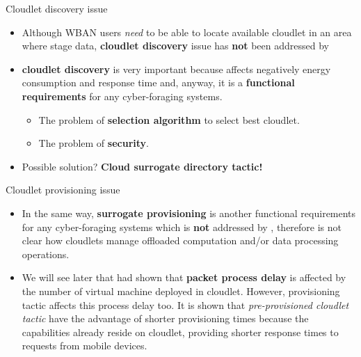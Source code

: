 \documentclass[10pt]{beamer}
\begin{document}
\begin{frame}{Cloudlet discovery issue} 

\begin{itemize}

\item Although WBAN users \textit{need} to be able to locate available cloudlet in an area where stage data, \textbf{cloudlet discovery} issue has \textbf{not} been addressed by \citet{MSAReport}

\item \textbf{cloudlet discovery} is very important because affects negatively energy consumption and response time and, anyway, it is a \textbf{functional requirements} for any cyber-foraging systems. 

\begin{itemize}
\item The problem of \textbf{selection algorithm} to select best cloudlet.
\item The problem of \textbf{security}.
\end{itemize}

\item Possible solution? \textbf{Cloud surrogate directory tactic!}

\end{itemize}

\end{frame} 
\begin{frame}{Cloudlet provisioning issue} 

\begin{itemize}

\item In the same way, \textbf{surrogate provisioning} is another functional requirements for any cyber-foraging systems which is \textbf{not} addressed by \citet{MSAReport}, therefore is not clear how cloudlets manage offloaded computation and/or data processing operations.

\item We will see later that \citet{MSAReport} had shown that \textbf{packet process delay} is affected by the number of virtual machine deployed in cloudlet. However, provisioning tactic affects this process delay too. It is shown that \textit{pre-provisioned cloudlet tactic} have the advantage of shorter provisioning times because the capabilities already reside on cloudlet, providing shorter response times to requests from mobile devices.\cite{DecisionModel}

\end{itemize}


\end{frame} 
\end{document}
